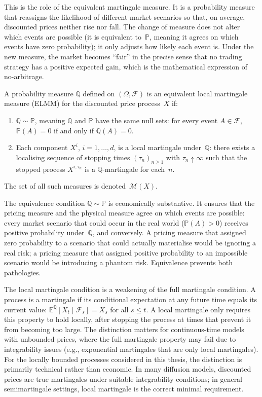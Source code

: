 This is the role of the equivalent martingale measure.  It is a
probability measure that reassigns the likelihood of different market
scenarios so that, on average, discounted prices neither rise nor fall.
The change of measure does not alter which events are possible (it is
equivalent to~$\mathbb{P}$, meaning it agrees on which events have
zero probability); it only adjusts how likely each event is.  Under the
new measure, the market becomes ``fair'' in the precise sense that no
trading strategy has a positive expected gain, which is the mathematical
expression of no-arbitrage.

\begin{definition}
\label{def:ELMM}
A probability measure $\mathbb{Q}$ defined on
$(\Omega, \mathcal{F})$ is an equivalent local martingale
measure (ELMM) for the discounted price process~$X$ if:
\begin{enumerate}
  \item $\mathbb{Q} \sim \mathbb{P}$, meaning $\mathbb{Q}$ and
    $\mathbb{P}$ have the same null sets: for every event $A \in
    \mathcal{F}$, $\mathbb{P}(A) = 0$ if and only if
    $\mathbb{Q}(A) = 0$.
  \item Each component $X^i$, $i = 1, \ldots, d$, is a local martingale
    under~$\mathbb{Q}$: there exists a localising sequence of stopping
    times $(\tau_n)_{n \ge 1}$ with $\tau_n \uparrow \infty$ such that
    the stopped process $X^{i,\tau_n}$ is a $\mathbb{Q}$-martingale for
    each~$n$.
\end{enumerate}
The set of all such measures is denoted~$\mathcal{M}(X)$.
\end{definition}

The equivalence condition $\mathbb{Q} \sim \mathbb{P}$ is economically
substantive.  It ensures that the pricing measure and the physical
measure agree on which events are possible: every market scenario that
could occur in the real world ($\mathbb{P}(A) > 0$) receives positive
probability under~$\mathbb{Q}$, and conversely.  A pricing measure that
assigned zero probability to a scenario that could actually materialise
would be ignoring a real risk; a pricing measure that assigned positive
probability to an impossible scenario would be introducing a phantom
risk.  Equivalence prevents both pathologies.

The local martingale condition is a weakening of the full martingale
condition.  A process is a martingale if its conditional expectation at
any future time equals its current value: $\mathbb{E}^{\mathbb{Q}}
[X_t \mid \mathcal{F}_s] = X_s$ for all $s \le t$.  A local martingale
only requires this property to hold locally, after stopping the process at
times that prevent it from becoming too large.  The distinction matters
for continuous-time models with unbounded prices, where the full
martingale property may fail due to integrability issues (e.g.,
exponential martingales that are only local martingales).  For the locally
bounded processes considered in this thesis, the distinction is primarily
technical rather than economic.  In many diffusion models, discounted
prices are true martingales under suitable integrability conditions; in
general semimartingale settings, local martingale is the correct minimal
requirement.

